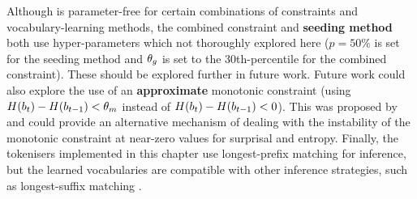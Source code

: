 Although \bytespan is parameter-free for certain combinations of constraints and vocabulary-learning methods, the combined constraint and \textbf{seeding method} both use hyper-parameters which not thoroughly explored here ($p=50\%$ is set for the seeding method and $\theta_g$ is set to the 30th-percentile for the combined constraint). These should be explored further in future work. Future work could also explore the use of an \textbf{approximate} monotonic constraint (using $H(b_t) - H(b_{t-1}) < \theta_m$ instead of $H(b_t) - H(b_{t-1}) < 0$). This was proposed by \citet{pagnoni2024byte} and could provide an alternative mechanism of dealing with the instability of the monotonic constraint at near-zero values for surprisal and entropy. Finally, the tokenisers implemented in this chapter use longest-prefix matching for inference, but the learned vocabularies are compatible with other inference strategies, such as longest-suffix matching \citep{jacobs2022lost}.




